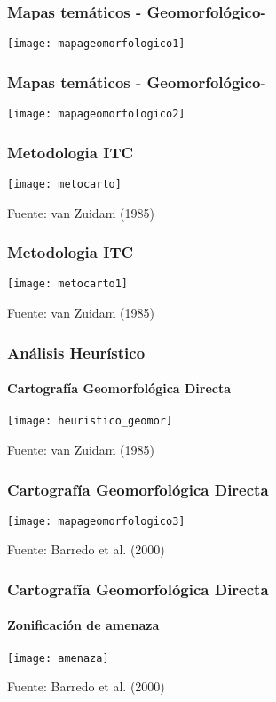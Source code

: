 \documentclass{beamer}
\begin{document}
\begin{frame}
\frametitle{Mapas temáticos - Geomorfológico-}
\begin{center}
   	\texttt{[image: mapageomorfologico1]}
\end{center}
\end{frame}
\begin{frame}
\frametitle{Mapas temáticos - Geomorfológico-}
\begin{center}
   	\texttt{[image: mapageomorfologico2]}
\end{center}
\end{frame}
\begin{frame}
\frametitle{Metodologia ITC}
\begin{center}
   	\texttt{[image: metocarto]}
\end{center}
\tiny{Fuente: van Zuidam (1985)}
\end{frame}
\begin{frame}
\frametitle{Metodologia ITC}
\begin{center}
   	\texttt{[image: metocarto1]}
\end{center}
\tiny{Fuente: van Zuidam (1985)}
\end{frame}
\begin{frame}
\frametitle{Análisis Heurístico}
\framesubtitle{Cartografía Geomorfológica Directa}
\begin{center}
   	\texttt{[image: heuristico\_geomor]}
\end{center}
\tiny{Fuente: van Zuidam (1985)}
\end{frame}
\begin{frame}
\frametitle{Cartografía Geomorfológica Directa}
\begin{center}
   	\texttt{[image: mapageomorfologico3]}
\end{center}
\tiny{Fuente: Barredo et al. (2000)}
\end{frame}
\begin{frame}
\frametitle{Cartografía Geomorfológica Directa}
\framesubtitle{Zonificación de amenaza}
\begin{center}
   	\texttt{[image: amenaza]}
\end{center}
\tiny{Fuente: Barredo et al. (2000)}
\end{frame}
\end{document}
